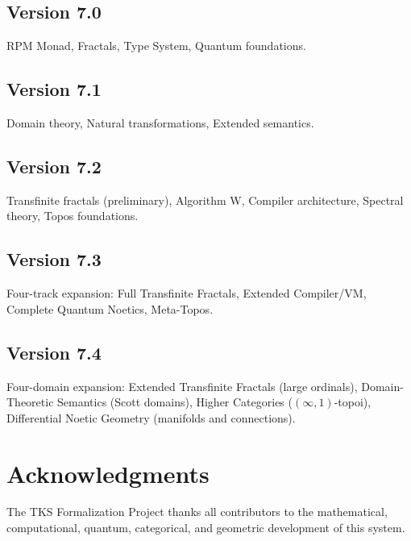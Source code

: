 \documentclass[11pt,twoside,openright]{book}
\theoremstyle{definition}
\theoremstyle{plain}
\theoremstyle{remark}
\begin{document}
\section{Version 7.0}
RPM Monad, Fractals, Type System, Quantum foundations.

\section{Version 7.1}
Domain theory, Natural transformations, Extended semantics.

\section{Version 7.2}
Transfinite fractals (preliminary), Algorithm W, Compiler architecture, Spectral theory, Topos foundations.

\section{Version 7.3}
Four-track expansion: Full Transfinite Fractals, Extended Compiler/VM, Complete Quantum Noetics, Meta-Topos.

\section{Version 7.4}
Four-domain expansion: Extended Transfinite Fractals (large ordinals), Domain-Theoretic Semantics (Scott domains), Higher Categories ($(\infty,1)$-topoi), Differential Noetic Geometry (manifolds and connections).

\backmatter

\chapter*{Acknowledgments}

The TKS Formalization Project thanks all contributors to the mathematical, computational, quantum, categorical, and geometric development of this system.
\end{document}
